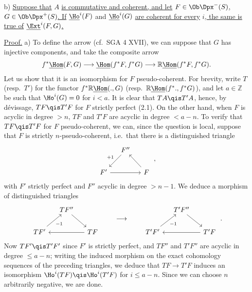 b) \uline{Suppose that} \(A\) \uline{is commutative and coherent, and let} \(F\in\Ob\Dpx^-(S)\)\uline{,} \(G\in\Ob\Dpx^+(S)\)\uline{. If} \(\underline{\Ho}^i(F)\) and \(\underline{\Ho}^i(G)\) \uline{are coherent for every} \(i\)\uline{, the same is true of} \(\underline{\Ext}^i(F,G)\)\uline{.}

\uline{Proof.} a) To define the arrow (cf.\ SGA 4 XVII), we can suppose that \(G\) has injective components, and take the composite arrow
\[
  f^*\underline{\Hom}(F,G)\longrightarrow\underline{\Hom}(f^*F,f^*G)\longrightarrow\mathbb{R}\underline{\Hom}(f^*F,f^*G).
\]
Let us show that it is an isomorphism for \(F\) pseudo-coherent. For brevity, write \(T\) (resp.\ \(T'\)) for the functor \(f^*\mathbb{R}\underline{\Hom}(.,G)\) (resp.\ \(\mathbb{R}\underline{\Hom}(f^*.,f^*G)\)), and let \(a\in\mathbb Z\) be such that \(\Ho^i(G)=0\) for \(i<a\). It is clear that \(TA\qis T'A\), hence, by dévissage, \(TF\qis T'F\) for \(F\) strictly perfect (2.1). On the other hand, when \(F\) is acyclic in degree \(>n\), \(TF\) and \(T'F\) are acyclic in degree \(<a-n\). To verify that \(TF\qis T'F\) for \(F\) pseudo-coherent, we can, since the question is local, suppose that \(F\) is strictly \(n\)-pseudo-coherent, i.e.\ that there is a distinguished triangle
\[
\begin{tikzcd}[column sep=small]
& F'' \arrow[dl,"+1"'] & \\
F' \arrow[rr] & & F \arrow[ul]
\end{tikzcd}
\;,
\]
with \(F'\) strictly perfect and \(F''\) acyclic in degree \(>n-1\). We deduce a morphism of distinguished triangles
\[
\begin{tikzcd}[column sep=small]
& TF'' \arrow[dr] & \\
TF' \arrow[ur,"-1"'] & & TF \arrow[ll]
\end{tikzcd}
\qquad\longrightarrow\qquad
\begin{tikzcd}[column sep=small]
& T'F'' \arrow[dr] & \\
T'F' \arrow[ur,"-1"'] & & T'F \arrow[ll]
\end{tikzcd}
\;.
\]
Now \(TF'\qis T'F'\) since \(F'\) is strictly perfect, and \(TF''\) and \(T'F''\) are
%
acyclic in degree \(\leq a-n\); writing the induced morphism on the exact cohomology sequences of the preceding triangles, we deduce that \(TF\to T'F\) induces an isomorphism \(\Ho^i(TF)\qis\Ho^i(T'F)\) for \(i\leq a-n\). Since we can choose \(n\) arbitrarily negative, we are done.

